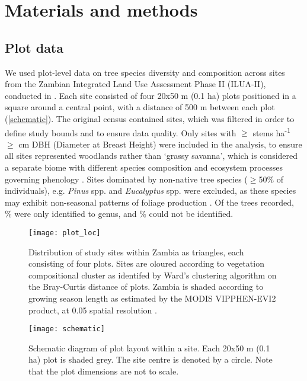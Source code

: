 \documentclass[11pt,a4paper]{article}
\begin{document}
\section{Materials and methods}

\subsection{Plot data}

We used plot-level data on tree species diversity and composition across \nSites{} sites from the Zambian Integrated Land Use Assessment Phase II (ILUA-II), conducted in \censusDate{} \citep{Mukosha2009, Pelletier2018}. Each site consisted of four 20x50 m (0.1 ha) plots positioned in a square around a central point, with a distance of 500 m between each plot (\autoref{schematic}). The original census contained \nTotalSites{} sites, which was filtered in order to define study bounds and to ensure data quality. Only sites with $\geq$\treesHa{} stems ha\textsuperscript{-1} $\geq$\stemSize{} cm DBH (Diameter at Breast Height) were included in the analysis, to ensure all sites represented woodlands rather than `grassy savanna', which is considered a separate biome with different species composition and ecosystem processes governing phenology \citep{Parr2014}. Sites dominated by non-native tree species ($\geq$50\% of individuals), e.g. \textit{Pinus} spp. and \textit{Eucalyptus} spp. were excluded, as these species may exhibit non-seasonal patterns of foliage production \citep{Broadhead2003}. Of the \nTrees{} trees recorded, \perSpIndet{}\% were only identified to genus, and \perGenIndet{}\% could not be identified.

\begin{figure}[H]
\centering
	\texttt{[image: plot\_loc]}
	\caption{Distribution of study sites within Zambia as triangles, each consisting of four plots. Sites are oloured according to vegetation compositional cluster as identifed by Ward's clustering algorithm on the Bray-Curtis distance of plots. Zambia is shaded according to growing season length as estimated by the MODIS VIPPHEN-EVI2 product, at 0.05\textdegree{} spatial resolution \citep{VIPPHEN}.}
	\label{plot_loc}
\end{figure}

\begin{figure}[H]
\centering
	\texttt{[image: schematic]}
	\caption{Schematic diagram of plot layout within a site. Each 20x50 m (0.1 ha) plot is shaded grey. The site centre is denoted by a circle. Note that the plot dimensions are not to scale.}
	\label{schematic}
\end{figure}
\end{document}
